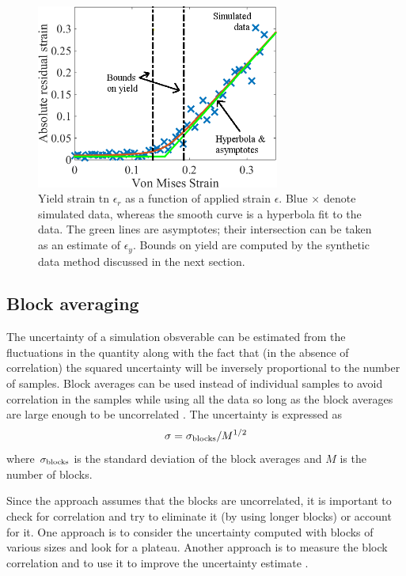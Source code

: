 \begin{figure}
\includegraphics[width=8cm]{hyperbola.png}\caption{Yield strain tn $\epsilon_r$ as a function of applied strain $\epsilon$.  Blue $\times$ denote simulated data, whereas the smooth curve is a hyperbola fit to the data.  The green lines are asymptotes; their intersection can be taken as an estimate of $\epsilon_y$.    Bounds on yield are computed by the synthetic data method discussed in the next section.}\label{fig:yield}
\end{figure}

\subsection{Block averaging}

The uncertainty of a simulation obsverable can be estimated from the fluctuations in the quantity along with the fact that (in the absence of correlation) the squared uncertainty will be inversely proportional to the number of samples.  Block averages can be used instead of individual samples to avoid correlation in the samples while using all the data so long as the block averages are large enough to be uncorrelated \cite{Friedberg1970,FrenkelSmit2002}.  The uncertainty is expressed as
\begin{equation}
  \sigma = \sigma_{\rm blocks}/M^{1/2}
\end{equation}
where $\sigma_{\rm blocks}$ is the standard deviation of the block averages and $M$ is the number of blocks.

Since the approach assumes that the blocks are uncorrelated, it is important to check for correlation and try to eliminate it (by using longer blocks) or account for it.  One approach is to consider the uncertainty computed with blocks of various sizes and look for a plateau.  Another approach is to measure the block correlation and to use it to improve the uncertainty estimate \cite{Kolafa1986}.

